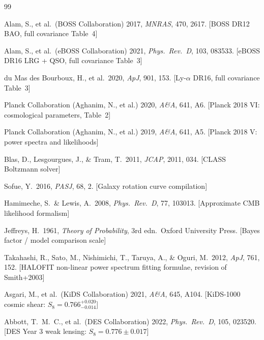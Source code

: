 \documentclass[12pt,a4paper]{article}
\begin{document}

\begin{thebibliography}{99}

Alam, S., et al.\ (BOSS Collaboration) 2017,
\textit{MNRAS}, 470, 2617.
[BOSS DR12 BAO, full covariance Table~4]

Alam, S., et al.\ (eBOSS Collaboration) 2021,
\textit{Phys.\ Rev.\ D}, 103, 083533.
[eBOSS DR16 LRG + QSO, full covariance Table~3]

du Mas des Bourboux, H., et al.\ 2020,
\textit{ApJ}, 901, 153.
[Ly-$\alpha$ DR16, full covariance Table~3]

Planck Collaboration (Aghanim, N., et al.) 2020,
\textit{A\&A}, 641, A6.
[Planck 2018 VI: cosmological parameters, Table~2]

Planck Collaboration (Aghanim, N., et al.) 2019,
\textit{A\&A}, 641, A5.
[Planck 2018 V: power spectra and likelihoods]

Blas, D., Lesgourgues, J., \& Tram, T.\ 2011,
\textit{JCAP}, 2011, 034.
[CLASS Boltzmann solver]

Sofue, Y.\ 2016, \textit{PASJ}, 68, 2.
[Galaxy rotation curve compilation]

Hamimeche, S.\ \& Lewis, A.\ 2008,
\textit{Phys.\ Rev.\ D}, 77, 103013.
[Approximate CMB likelihood formalism]

Jeffreys, H.\ 1961,
\textit{Theory of Probability}, 3rd edn.\ Oxford University Press.
[Bayes factor / model comparison scale]

Takahashi, R., Sato, M., Nishimichi, T., Taruya, A., \& Oguri, M.\ 2012,
\textit{ApJ}, 761, 152.
[HALOFIT non-linear power spectrum fitting formulae, revision of Smith+2003]

Asgari, M., et al.\ (KiDS Collaboration) 2021,
\textit{A\&A}, 645, A104.
[KiDS-1000 cosmic shear: $S_8 = 0.766^{+0.020}_{-0.014}$]

Abbott, T.~M.~C., et al.\ (DES Collaboration) 2022,
\textit{Phys.\ Rev.\ D}, 105, 023520.
[DES Year 3 weak lensing: $S_8 = 0.776 \pm 0.017$]


\end{thebibliography}
\end{document}
